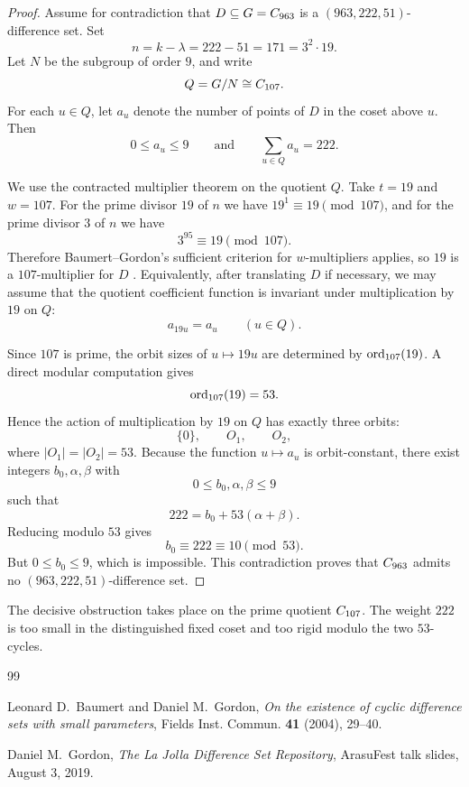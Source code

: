 \documentclass[11pt]{amsart}
\begin{document}
\begin{proof}
Assume for contradiction that $D\subseteq G=C_{963}$ is a $(963,222,51)$-difference set.
Set
\[
n=k-\lambda=222-51=171=3^2\cdot 19.
\]
Let $N$ be the subgroup of order $9$, and write
\[
Q=G/N\cong C_{107}.
\]
For each $u\in Q$, let $a_u$ denote the number of points of $D$ in the coset above $u$.
Then
\[
0\le a_u\le 9
\qquad\text{and}\qquad
\sum_{u\in Q} a_u = 222.
\]

We use the contracted multiplier theorem on the quotient $Q$.
Take $t=19$ and $w=107$.
For the prime divisor $19$ of $n$ we have $19^1\equiv 19\pmod{107}$, and for the prime divisor $3$ of $n$ we have
\[
3^{95}\equiv 19 \pmod{107}.
\]
Therefore Baumert--Gordon's sufficient criterion for $w$-multipliers applies, so $19$ is a $107$-multiplier for $D$ \cite[Thm.~3.2]{BG2004}.
Equivalently, after translating $D$ if necessary, we may assume that the quotient coefficient function is invariant under multiplication by $19$ on $Q$:
\[
a_{19u}=a_u \qquad (u\in Q).
\]

Since $107$ is prime, the orbit sizes of $u\mapsto 19u$ are determined by $\operatorname{ord}_{107}(19)$.
A direct modular computation gives
\[
\operatorname{ord}_{107}(19)=53.
\]
Hence the action of multiplication by $19$ on $Q$ has exactly three orbits:
\[
\{0\},\qquad O_1,\qquad O_2,
\]
where $|O_1|=|O_2|=53$.
Because the function $u\mapsto a_u$ is orbit-constant, there exist integers $b_0,\alpha,\beta$ with
\[
0\le b_0,\alpha,\beta\le 9
\]
such that
\[
222 = b_0 + 53(\alpha+\beta).
\]
Reducing modulo $53$ gives
\[
b_0 \equiv 222 \equiv 10 \pmod{53}.
\]
But $0\le b_0\le 9$, which is impossible.
This contradiction proves that $C_{963}$ admits no $(963,222,51)$-difference set.
\end{proof}

\begin{remark}
The decisive obstruction takes place on the prime quotient $C_{107}$.
The weight $222$ is too small in the distinguished fixed coset and too rigid modulo the two $53$-cycles.
\end{remark}

\begin{thebibliography}{99}

Leonard D.~Baumert and Daniel M.~Gordon,
\emph{On the existence of cyclic difference sets with small parameters},
Fields Inst. Commun. \textbf{41} (2004), 29--40.

Daniel M.~Gordon,
\emph{The La Jolla Difference Set Repository},
ArasuFest talk slides, August 3, 2019.

\end{thebibliography}
\end{document}
